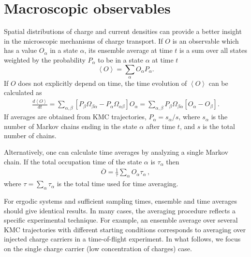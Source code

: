 \section{Macroscopic observables}
\label{sec:analysis}%
Spatial distributions of charge and current densities can provide a better 
insight in the microscopic mechanisms of charge transport.
%
If $O$ is an observable which has a value $O_\alpha$ in a state $\alpha$, its 
ensemble average at time $t$ is a sum over all states weighted by the 
probability $P_\alpha$ to be in a state $\alpha$ at time $t$
%
\begin{equation}
\label{equ:ensemble}
\left< O \right> = \sum_{\alpha} O_\alpha P_\alpha.
\end{equation}
%
If $O$ does not explicitly depend on time, the time evolution of $\left< O 
\right>$ can be calculated as
\begin{equation}
\begin{split}
\frac{d \left< O \right>}{dt} = \sum_{ \alpha, \beta} 
      \left[ P_\beta \Omega_{\beta \alpha} - 
       P_\alpha \Omega_{\alpha \beta} \right] 
      O_\alpha %
      = \sum_{ \alpha, \beta} 
      P_\beta \Omega_{\beta \alpha}  
      \left[ O_\alpha - O_\beta \right] .
\end{split}
\end{equation}
%
If averages are obtained from KMC trajectories, $P_\alpha = s_\alpha / s$, where 
$s_\alpha$ is the number of Markov chains ending in the state $\alpha$ after 
time $t$, and $s$ is the total number of chains.

Alternatively, one can calculate time averages by analyzing a single Markov 
chain. If the total occupation time of the state $\alpha$ is $\tau_\alpha$ then
\begin{align}
\label{equ:time}
\overline{ O } 
= \frac{1}{\tau} \sum_{\alpha} O_\alpha \tau_\alpha \,,
\end{align}
where $\tau = \sum_{\alpha} \tau_\alpha$ is the total time used for time 
averaging.

For ergodic systems and sufficient sampling times, ensemble and time averages 
should give identical results. 
In many cases, the averaging procedure reflects a specific experimental 
technique. For example, an ensemble average over several KMC trajectories with 
different starting conditions corresponds to averaging over injected charge 
carriers in a time-of-flight experiment.  In what follows, we focus on the 
single charge carrier (low concentration of charges) case. 

